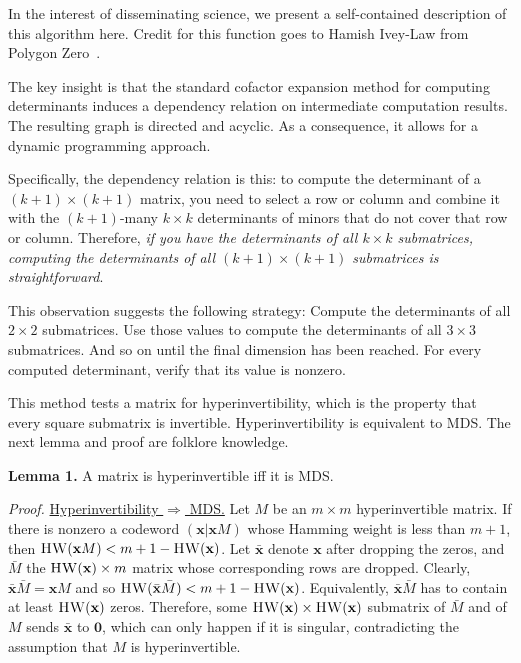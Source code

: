 \documentclass[a4paper]{article}
\begin{document}
In the interest of disseminating science, we present a self-contained description of this algorithm here. Credit for this function goes to Hamish Ivey-Law from Polygon Zero~\cite{polygon-zero}.

The key insight is that the standard cofactor expansion method for computing determinants induces a dependency relation on intermediate computation results. The resulting graph is directed and acyclic. As a consequence, it allows for a dynamic programming approach.

Specifically, the dependency relation is this: to compute the determinant of a $(k+1) \times (k+1)$ matrix, you need to select a row or column and combine it with the $(k+1)$-many $k \times k$ determinants of minors that do not cover that row or column. Therefore, \emph{if you have the determinants of all $k \times k$ submatrices, computing the determinants of all $(k+1) \times (k+1)$ submatrices is straightforward}.

This observation suggests the following strategy: Compute the determinants of all $2 \times 2$ submatrices. Use those values to compute the determinants of all $3 \times 3$ submatrices. And so on until the final dimension has been reached. For every computed determinant, verify that its value is nonzero.

This method tests a matrix for hyperinvertibility, which is the property that every square submatrix is invertible. Hyperinvertibility is equivalent to MDS. The next lemma and proof are folklore knowledge.

\textbf{Lemma 1.} A matrix is hyperinvertible iff it is MDS.

\textit{Proof.} \underline{Hyperinvertibility $\Rightarrow$ MDS.} Let $M$ be an $m \times m$ hyperinvertible matrix. If there is nonzero a codeword $(\mathbf{x} \vert \mathbf{x}M)$ whose Hamming weight is less than $m+1$, then $\textnormal{\textsc{HW}}(\mathbf{x}M) < m+1 - \textnormal{\textsc{HW}}(\mathbf{x})$. Let $\bar{\mathbf{x}}$ denote $\mathbf{x}$ after dropping the zeros, and $\bar{M}$ the $\textnormal{\textsc{HW}}(\mathbf{x}) \times m$ matrix whose corresponding rows are dropped. Clearly, $\bar{\mathbf{x}}\bar{M} = \mathbf{x} M$ and so $\textnormal{\textsc{HW}}(\bar{\mathbf{x}}\bar{M})< m+1 - \textnormal{\textsc{HW}}(\mathbf{x})$. Equivalently, $\bar{\mathbf{x}}\bar{M}$ has to contain at least $\textnormal{\textsc{HW}}(\mathbf{x})$ zeros. Therefore, some $\textnormal{\textsc{HW}}(\mathbf{x}) \times \textnormal{\textsc{HW}}(\mathbf{x})$ submatrix of $\bar{M}$ and of $M$ sends $\bar{\mathbf{x}}$ to $\mathbf{0}$, which can only happen if it is singular, contradicting the assumption that $M$ is hyperinvertible.
\end{document}
